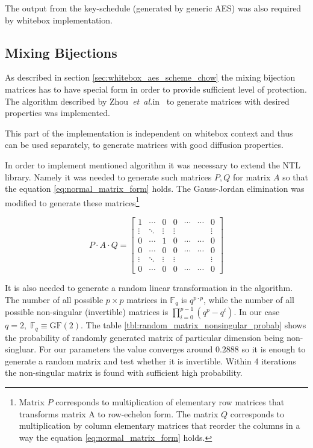 \documentclass[11pt,oneside,final]{fithesis2}
\newcommand{\gf}{\ensuremath{\text{GF}\left(2\right)}}
\newcommand{\eal}{\emph{et~al.}}
\begin{document}
    The output from the key-schedule (generated by generic AES) was also required by whitebox implementation.
    
    \subsection{Mixing Bijections}
    As described in section \ref{sec:whitebox_aes_scheme_chow} the mixing bijection matrices has to have special form in order to provide sufficient 
    level of protection. The algorithm described by Zhou~\eal in~\citep{journals/iacr/XiaoZ02} to generate matrices with desired properties was implemented.
    
    This part of the implementation is independent on whitebox context and thus can be used separately, to generate matrices with good diffusion properties.
    
    In order to implement mentioned algorithm it was necessary to extend the NTL library. Namely it was needed to generate such matrices $P, Q$ for matrix $A$
    so that the equation \ref{eq:normal_matrix_form} holds. The Gauss-Jordan elimination was modified to generate these matrices\footnote{Matrix $P$ corresponds to multiplication of 
    elementary row matrices that transforms matrix A to row-echelon form. The matrix $Q$ corresponds to multiplication by column elementary matrices that
    reorder the columns in a way the equation \ref{eq:normal_matrix_form} holds.}

    \begin{equation}\label{eq:normal_matrix_form}
	P \cdot A \cdot Q = 
	\begin{bmatrix}
	    1      & \cdots & 0      & 0      & \cdots & \cdots & 0      \\
	    \vdots & \ddots & \vdots & \vdots &        &        & \vdots \\ 
	    0      & \cdots & 1      & 0      & \cdots & \cdots & 0      \\
	    0      & \cdots & 0      & 0      & \cdots & \cdots & 0      \\
	    \vdots & \ddots & \vdots & \vdots &        &        & \vdots \\ 
	    0      & \cdots & 0      & 0      & \cdots & \cdots & 0      
	\end{bmatrix}
    \end{equation}
    
    It is also needed to generate a random linear transformation in the algorithm. The number of all possible $p \times p$ matrices 
    in $\mathbb{F}_q$ is $q^{p\cdot p}$, while the number of all possible non-singular (invertible) matrices is $\prod_{i=0}^{p-1}(q^p - q^i)$.
    In our case $q=2, \; \mathbb{F}_q \equiv \gf$. The table \ref{tbl:random_matrix_nonsingular_probab} shows the probability of randomly generated matrix of particular 
    dimension being non-singluar. For our parameters the value converges around $0.2888$ so it is enough to generate a random matrix
    and test whether it is invertible. Within 4 iterations the non-singular matrix is found with sufficient high probability.
\end{document}
